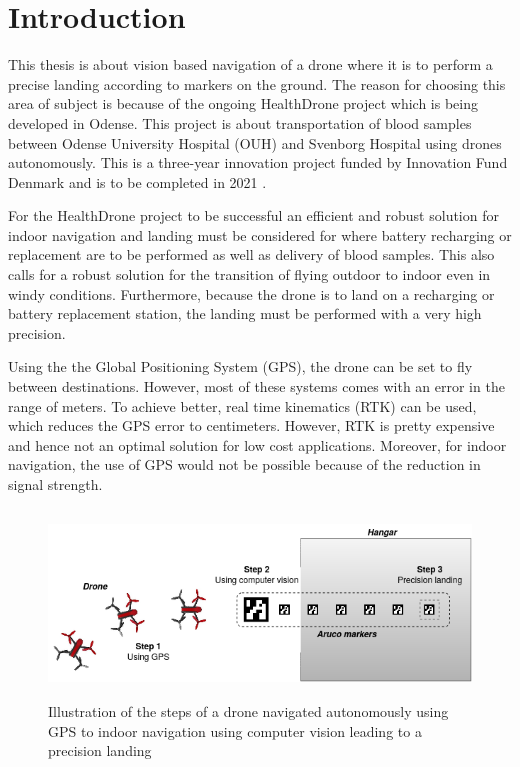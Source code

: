 \documentclass[../Head/Report.tex]{subfiles}
\begin{document}
\section{Introduction}

This thesis is about vision based navigation of a drone where it is to perform a precise landing according to markers on the ground. The reason for choosing this area of subject is because of the ongoing HealthDrone project which is being developed in Odense. This project is about transportation of blood samples between Odense University Hospital (OUH) and Svenborg Hospital using drones autonomously. This is a three-year innovation project funded by Innovation Fund Denmark and is to be completed in 2021 \cite{HealthDrone}.

For the HealthDrone project to be successful an efficient and robust solution for indoor navigation and landing must be considered for where battery recharging or replacement are to be performed as well as delivery of blood samples. This also calls for a robust solution for the transition of flying outdoor to indoor even in windy conditions. Furthermore, because the drone is to land on a recharging or battery replacement station, the landing must be performed with a very high precision.

Using the the Global Positioning System (GPS), the drone can be set to fly between destinations. However, most of these systems comes with an error in the range of meters. To achieve better, real time kinematics (RTK) can be used, which reduces the GPS error to centimeters. However, RTK is pretty expensive and hence not an optimal solution for low cost applications. Moreover, for indoor navigation, the use of GPS would not be possible because of the reduction in signal strength. 

\begin{figure}[H]
	\centering
	\includegraphics[height=5cm]{../Figures/masterProjectIllustration.png}
	\captionsetup{justification=centering}
    \caption{Illustration of the steps of a drone navigated autonomously using GPS to indoor navigation using computer vision leading to a precision landing }
    \label{fig:masterProjectIllustration}
\end{figure}
\end{document}
